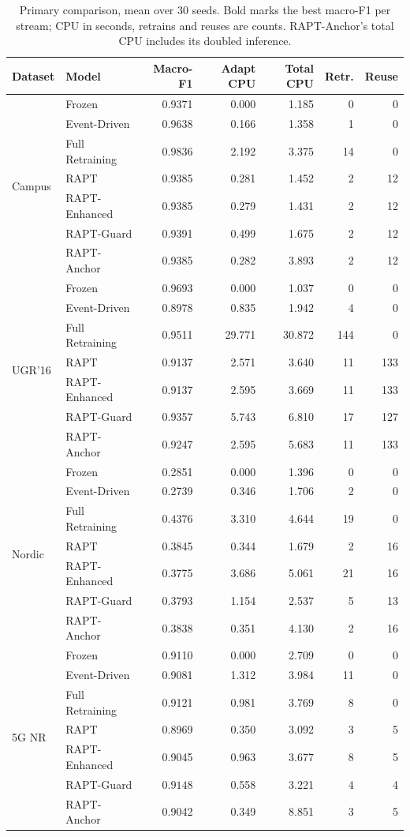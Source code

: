 \begin{table}[t]
\caption{Primary comparison, mean over 30 seeds. Bold marks the best macro-F1 per stream; CPU in seconds, retrains and reuses are counts. RAPT-Anchor's total CPU includes its doubled inference.}
\label{tab:primary}
\centering
\scriptsize
\begin{tabular}{@{}llrrrrr@{}}
\toprule
\textbf{Dataset} & \textbf{Model} & \textbf{Macro-F1} & \textbf{Adapt CPU} & \textbf{Total CPU} & \textbf{Retr.} & \textbf{Reuse}\\
\midrule
\multirow{7}{*}{Campus} & Frozen & 0.9371 & 0.000 & 1.185 & 0 & 0 \\
 & Event-Driven & 0.9638 & 0.166 & 1.358 & 1 & 0 \\
 & Full Retraining & $\mathbf{0.9836}$ & 2.192 & 3.375 & 14 & 0 \\
 & RAPT & 0.9385 & 0.281 & 1.452 & 2 & 12 \\
 & RAPT-Enhanced & 0.9385 & 0.279 & 1.431 & 2 & 12 \\
 & RAPT-Guard & 0.9391 & 0.499 & 1.675 & 2 & 12 \\
 & RAPT-Anchor & 0.9385 & 0.282 & 3.893 & 2 & 12 \\
\midrule
\multirow{7}{*}{UGR'16} & Frozen & $\mathbf{0.9693}$ & 0.000 & 1.037 & 0 & 0 \\
 & Event-Driven & 0.8978 & 0.835 & 1.942 & 4 & 0 \\
 & Full Retraining & 0.9511 & 29.771 & 30.872 & 144 & 0 \\
 & RAPT & 0.9137 & 2.571 & 3.640 & 11 & 133 \\
 & RAPT-Enhanced & 0.9137 & 2.595 & 3.669 & 11 & 133 \\
 & RAPT-Guard & 0.9357 & 5.743 & 6.810 & 17 & 127 \\
 & RAPT-Anchor & 0.9247 & 2.595 & 5.683 & 11 & 133 \\
\midrule
\multirow{7}{*}{Nordic} & Frozen & 0.2851 & 0.000 & 1.396 & 0 & 0 \\
 & Event-Driven & 0.2739 & 0.346 & 1.706 & 2 & 0 \\
 & Full Retraining & $\mathbf{0.4376}$ & 3.310 & 4.644 & 19 & 0 \\
 & RAPT & 0.3845 & 0.344 & 1.679 & 2 & 16 \\
 & RAPT-Enhanced & 0.3775 & 3.686 & 5.061 & 21 & 16 \\
 & RAPT-Guard & 0.3793 & 1.154 & 2.537 & 5 & 13 \\
 & RAPT-Anchor & 0.3838 & 0.351 & 4.130 & 2 & 16 \\
\midrule
\multirow{7}{*}{5G NR} & Frozen & 0.9110 & 0.000 & 2.709 & 0 & 0 \\
 & Event-Driven & 0.9081 & 1.312 & 3.984 & 11 & 0 \\
 & Full Retraining & 0.9121 & 0.981 & 3.769 & 8 & 0 \\
 & RAPT & 0.8969 & 0.350 & 3.092 & 3 & 5 \\
 & RAPT-Enhanced & 0.9045 & 0.963 & 3.677 & 8 & 5 \\
 & RAPT-Guard & $\mathbf{0.9148}$ & 0.558 & 3.221 & 4 & 4 \\
 & RAPT-Anchor & 0.9042 & 0.349 & 8.851 & 3 & 5 \\
\bottomrule
\end{tabular}
\end{table}
